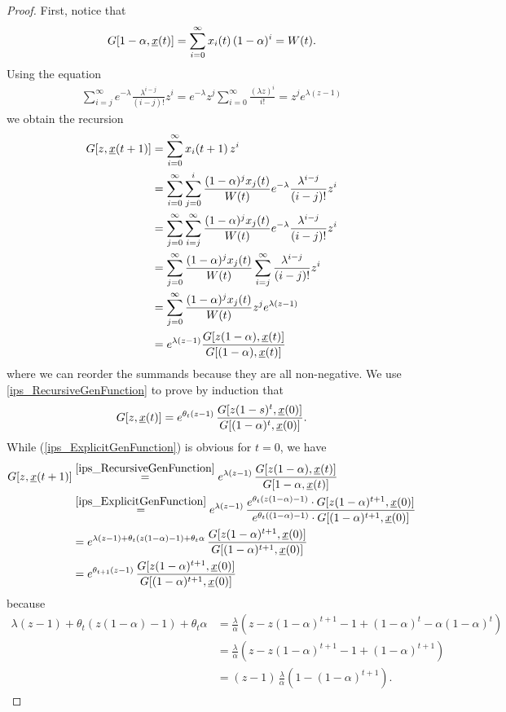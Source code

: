 \begin{proof}
\noindent
First, notice that
\[ G[1-\alpha, \underline{x} \! \left( t \right)] = \sum_{i=0}^\infty x_{i} \! \left( t \right) (1-\alpha)^i = W(t). \]
Using the equation
\begin{align} \label{ips_Maia_NR}
\sum_{i=j}^\infty e^{-\lambda} \frac{\lambda^{i-j}}{(i-j)!} z^i
=  e^{-\lambda} z^j \sum_{i=0}^\infty \frac{(\lambda z)^i}{i!}
=  z^j e^{\lambda(z-1)}
\end{align}
we obtain the recursion
\begin{equation}
\begin{aligned}
G[z,\mrIpsT{t+1}]
& =  \sum_{i=0}^\infty \mrIpsKT{i}{t+1} z^i \\
& =  \sum_{i=0}^\infty \sum_{j=0}^i \frac{(1-\alpha)^j \mrIpsKT{j}{t}}{W(t)}
e^{-\lambda} \frac{\lambda^{i-j}}{(i-j)!} z^i \\
& =  \sum_{j=0}^\infty \sum_{i=j}^\infty \frac{(1-\alpha)^j \mrIpsKT{j}{t}}{W(t)}
e^{-\lambda} \frac{\lambda^{i-j}}{(i-j)!} z^i \\
& =  \sum_{j=0}^\infty \frac{(1-\alpha)^j \mrIpsKT{j}{t}}{W(t)} \sum_{i=j}^\infty
\frac{\lambda^{i-j}}{(i-j)!} z^i \\
& =  \sum_{j=0}^\infty \frac{(1-\alpha)^j \mrIpsKT{j}{t}}{W(t)} z^j e^{\lambda(z-1)} \\
& =  e^{\lambda(z-1)} \frac{G[z(1-\alpha),\mrIpsT{t}]}{G[(1-\alpha),\mrIpsT{t}]}
\label{ips_RecursiveGenFunction}
\end{aligned}
\end{equation}
where we can reorder the summands because they are all non-negative.
We use \eqref{ips_RecursiveGenFunction} to prove by induction that
\begin{equation} \label{ips_ExplicitGenFunction}
G[z,\underline{x} \! \left( t \right)] = e^{\theta_t (z-1)} \,
\frac{G[z(1-s)^t,\underline{x} \! \left( 0 \right)]}{G[(1-\alpha)^t,\underline{x} \! \left( 0 \right)]} .
\end{equation}
While (\ref{ips_ExplicitGenFunction}) is obvious for
$t=0$, we have
\begin{align*}
G[z,\mrIpsT{t+1}]
&\stackrel{\eqref{ips_RecursiveGenFunction}}{=} e^{\lambda (z-1)} \,
\frac{G[z(1-\alpha),\mrIpsT{t}]}{G[1-\alpha,\mrIpsT{t}]} \\
&\stackrel{\eqref{ips_ExplicitGenFunction}}{=} e^{\lambda (z-1)} \,
\frac{e^{\theta_t (z(1-\alpha)-1)} \cdot G[z(1-\alpha)^{t+1},\mrIpsT{0}]}
{e^{\theta_t ((1-\alpha)-1)} \cdot G[(1-\alpha)^{t+1},\mrIpsT{0}]} \\
& =  e^{ \lambda (z-1) + \theta_t (z (1-\alpha) -1) + \theta_t \alpha } \,
\frac{G[z(1-\alpha)^{t+1},\mrIpsT{0}]}{G[(1-\alpha)^{t+1},\mrIpsT{0}]} \\ 
& = e^{\theta_{t+1}(z-1)} \,
\frac{G[z(1-\alpha)^{t+1},\mrIpsT{0}]}{G[(1-\alpha)^{t+1},\mrIpsT{0}]}
\end{align*}
because
\begin{align*}
\lambda (z-1) + \theta_t(z (1-\alpha) -1) + \theta_t \alpha
& = \frac{\lambda}{\alpha} \left( z-z(1-\alpha)^{t+1}-1+(1-\alpha)^t-\alpha(1-\alpha)^t \right) \\
& = \frac{\lambda}{\alpha} \left( z-z(1-\alpha)^{t+1}-1+(1-\alpha)^{t+1} \right) \\
& = (z-1) \, \frac{\lambda}{\alpha} (1-(1-\alpha)^{t+1}).
\end{align*}


\end{proof}
